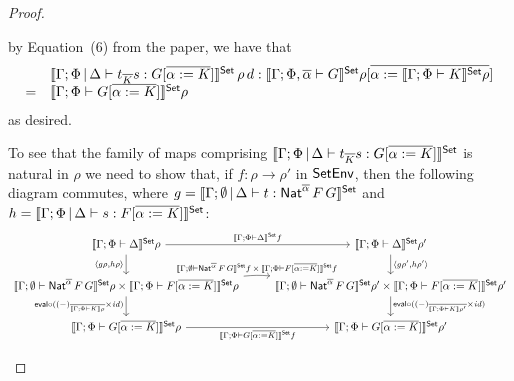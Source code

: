 \documentclass[acmsmall,review,anonymous]{acmart}
\theoremstyle{definition}
\renewcommand{\id}{\mathit{id}}
\begin{document}
\begin{proof}
\begin{itemize}
      by Equation~(6) from the paper,
we have that 
\[\begin{array}{ll}
  &\llbracket{\Gamma;\Phi \,|\, \Delta
  \vdash t_{\overline K} s: G [\overline{\alpha :=
      K}]}\rrbracket^{\mathsf{Set}}\,\rho\,d : \llbracket{\Gamma; \Phi ,\overline{\alpha} \vdash
  G}\rrbracket^{\mathsf{Set}}\rho[\overline{\alpha := \llbracket{\Gamma;\Phi \vdash K}\rrbracket^{\mathsf{Set}}\rho}]  \\
  =&\llbracket{\Gamma; \Phi \vdash G[\overline{\alpha := K}]}\rrbracket^{\mathsf{Set}}\rho
\end{array}\]
as desired.

\vspace*{0.1in}

To see that the family of maps comprising $\llbracket{\Gamma;\Phi \,|\,
  \Delta \vdash t_{\overline K} s: G [\overline{\alpha := K}]}\rrbracket^{\mathsf{Set}}$
is natural in $\rho$
we need to show that, if $f : \rho \to \rho'$ in $\mathsf{SetEnv}$, then the
following diagram commutes, where $g = \llbracket{\Gamma; \emptyset \,|\,
  \Delta \vdash t : \mathsf{Nat}^{\overline{\alpha}} \,F \,G}\rrbracket^{\mathsf{Set}}$ and $h =
\llbracket{\Gamma;\Phi \,|\, \Delta \vdash s: F [\overline{\alpha :=
      K}]}\rrbracket^{\mathsf{Set}}$:
{\footnotesize
\[\begin{tikzcd}
\setsem{\Gamma;\Phi \vdash \Delta}\rho \ar[r, "{\setsem{\Gamma;\Phi
  \vdash \Delta}f}"] \ar[d, "{\langle g \rho, h \rho\rangle}"']
& \setsem{\Gamma;\Phi \vdash 
  \Delta}\rho' \ar[d, "{\langle g \rho', h \rho' \rangle}"]\\
\setsem{\Gamma;\emptyset \vdash \Nat^{\overline{\alpha}} \,F \,G}\rho
\times \setsem{\Gamma;\Phi \vdash F [\overline{\alpha := K}]}\rho
\ar[d, "{\eval \circ ((-)_{\overline{\sem{\Gamma;\Phi \vdash K}\rho}} \times
    \id)}"']
\ar[r, bend left = 5, "{\setsem{\Gamma;\emptyset\vdash
      \Nat^{\overline{\alpha}} \,F \,G}f\, \times\, \setsem{\Gamma;\Phi
      \vdash F [\overline{\alpha := K}]}f}"] &
\setsem{\Gamma;\emptyset \vdash \Nat^{\overline{\alpha}} \,F \,G}\rho'
\times \setsem{\Gamma;\Phi \vdash F [\overline{\alpha := K}]}\rho'
\ar[d, "{\eval \circ ((-)_{\overline{\sem{\Gamma;\Phi \vdash
          K}\rho'}} \times \id)}"] \\
\setsem{\Gamma;\Phi \vdash G [\overline{\alpha := K}]}\rho
\ar[r, "{\setsem{\Gamma;\Phi \vdash G [\overline{\alpha := K}]}f}"']
&
\setsem{\Gamma;\Phi \vdash G [\overline{\alpha := K}]}\rho'
\end{tikzcd}\]}


\end{itemize}
\end{proof}
\end{document}

